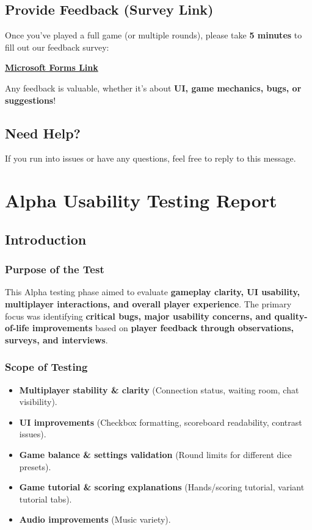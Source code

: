 \documentclass[12pt, titlepage]{article}
\begin{document}
\subsection{Provide Feedback (Survey Link)}

Once you’ve played a full game (or multiple rounds), please take \textbf{5 minutes} to fill out our feedback survey:

\href{https://forms.office.com/r/87fhfHWjjW}{\textbf{Microsoft Forms Link}}

Any feedback is valuable, whether it's about \textbf{UI, game mechanics, bugs, or suggestions}!

\subsection{Need Help?}
If you run into issues or have any questions, feel free to reply to this message.

\newpage

\section{Alpha Usability Testing Report}

\subsection{Introduction}
\subsubsection{Purpose of the Test}
This Alpha testing phase aimed to evaluate \textbf{gameplay clarity, UI usability, multiplayer interactions, and overall player experience}. The primary focus was identifying \textbf{critical bugs, major usability concerns, and quality-of-life improvements} based on \textbf{player feedback through observations, surveys, and interviews}.

\subsubsection{Scope of Testing}
\begin{itemize}
    \item \textbf{Multiplayer stability \& clarity} (Connection status, waiting room, chat visibility).
    \item \textbf{UI improvements} (Checkbox formatting, scoreboard readability, contrast issues).
    \item \textbf{Game balance \& settings validation} (Round limits for different dice presets).
    \item \textbf{Game tutorial \& scoring explanations} (Hands/scoring tutorial, variant tutorial tabs).
    \item \textbf{Audio improvements} (Music variety).
\end{itemize}
\end{document}
